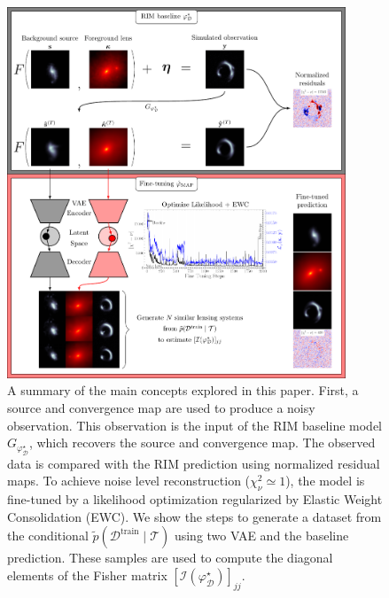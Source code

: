 \documentclass[twocolumn]{aastex631}
\begin{document}
\begin{figure}[ht!]
        \centering
        \includegraphics[width=0.9\textwidth]{figures/main_figure}
        \caption{A summary of the main concepts explored in this paper. First, 
        a source and convergence map are used to produce a noisy observation. This observation 
        is the input of the RIM baseline model $G_{\varphi_{\mathcal{D}}^{\star}}$, which 
        recovers the source and convergence map. The observed data is compared with 
        the RIM prediction using normalized residual maps. To achieve noise level reconstruction 
        ($\chi^2_\nu \simeq 1$), 
        the model is fine-tuned by a likelihood optimization regularized by Elastic Weight Consolidation (EWC). 
        We show the steps 
        to generate a dataset from the conditional $\tilde{p}(\mathcal{D}^{\mathrm{train}} \mid \mathcal{T})$ 
        using two VAE and the baseline prediction. 
        These samples are used to compute the diagonal elements of the 
        Fisher matrix $[\mathcal{I}(\varphi_{\mathcal{D}}^{\star})]_{jj}$.
}
        \label{fig:main figure}
\end{figure}
\end{document}
